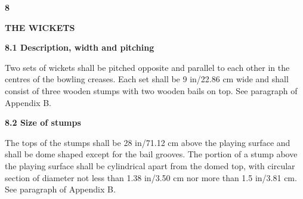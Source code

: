 \documentclass[12pt]{article}
\begin{document}
\vspace{\baselineskip}

\vspace{\baselineskip}

\vspace{\baselineskip}

\vspace{\baselineskip}
\begin{Center}
{\fontsize{8pt}{9.6pt}\par}
\end{Center}\par


\vspace{\baselineskip}
{\fontsize{16pt}{19.2pt}\selectfont \textbf{8 \tabto{0.29in} }{\fontsize{15pt}{18.0pt}\selectfont \textbf{THE WICKETS}\par}\par}\par


\vspace{\baselineskip}
{\fontsize{11pt}{13.2pt}\selectfont \textbf{8.1 \tabto{0.47in} Description, width and pitching}\par}\par


\vspace{\baselineskip}
\begin{adjustwidth}{0.0in}{0.14in}
{\fontsize{9pt}{10.8pt}\selectfont Two sets of wickets shall be pitched opposite and parallel to each other in the centres of the bowling creases. Each set shall be 9 in/22.86 cm wide and shall consist of three wooden stumps with two wooden bails on top. See paragraph of Appendix B.\par}\par

\end{adjustwidth}


\vspace{\baselineskip}
{\fontsize{11pt}{13.2pt}\selectfont \textbf{8.2 \tabto{0.47in} Size of stumps}\par}\par


\vspace{\baselineskip}
\begin{adjustwidth}{0.0in}{0.04in}
{\fontsize{9pt}{10.8pt}\selectfont The tops of the stumps shall be 28 in/71.12 cm above the playing surface and shall be dome shaped except for the bail grooves. The portion of a stump above the playing surface shall be cylindrical apart from the domed top, with circular section of diameter not less than 1.38 in/3.50 cm nor more than 1.5 in/3.81 cm. See paragraph of Appendix B.\par}\par

\end{adjustwidth}
\end{document}

